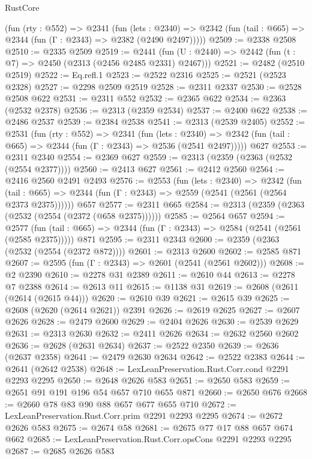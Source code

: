\begin{lexlean}{RustCore}
\begin{coremodule}
    (fun (rty : @552) =>
    @2341
      (fun (lets : @2340) =>
      @2342 (fun (tail : @665) => @2344 (fun (Γ : @2343) => @2382 (@2490 @2497)))))
@2509 := @2338 @2508
@2510 := @2335 @2509
@2519 := @2441 (fun (U : @2440) => @2442 (fun (t : @7) => @2450 (@2313 (@2456 @2485 @2331) @2467)))
@2521 := @2482 (@2510 @2519)
@2522 := Eq.refl.{1}
@2523 := @2522 @2316
@2525 := @2521 (@2523 @2328)
@2527 := @2298 @2509 @2519
@2528 := @2311 @2337
@2530 := @2528 @2508 @622
@2531 := @2311 @552
@2532 := @2365 @622
@2534 := @2363 (@2532 @2378)
@2536 := @2313 (@2359 @2534)
@2537 := @2400 @622
@2538 := @2486 @2537
@2539 := @2384 @2538
@2541 := @2313 (@2539 @2405)
@2552 := @2531
    (fun (rty : @552) =>
    @2341
      (fun (lets : @2340) =>
      @2342 (fun (tail : @665) => @2344 (fun (Γ : @2343) => @2536 (@2541 @2497)))))
    @627
@2553 := @2311 @2340
@2554 := @2369 @627
@2559 := @2313 (@2359 (@2363 (@2532 (@2554 @2377))))
@2560 := @2413 @627
@2561 := @2412 @2560
@2564 := @2416 @2560 @2491 @2493
@2576 := @2553
    (fun (lets : @2340) =>
    @2342
      (fun (tail : @665) => @2344 (fun (Γ : @2343) => @2559 (@2541 (@2561 (@2564 @2373 @2375))))))
    @657
@2577 := @2311 @665
@2584 := @2313 (@2359 (@2363 (@2532 (@2554 (@2372 (@658 @2375))))))
@2585 := @2564 @657
@2594 := @2577
    (fun (tail : @665) => @2344 (fun (Γ : @2343) => @2584 (@2541 (@2561 (@2585 @2375)))))
    @871
@2595 := @2311 @2343
@2600 := @2359 (@2363 (@2532 (@2554 (@2372 @872))))
@2601 := @2313 @2600
@2602 := @2585 @871
@2607 := @2595 (fun (Γ : @2343) => @2601 (@2541 (@2561 @2602)))
@2608 := @2 @2390
@2610 := @2278 @31 @2389
@2611 := @2610 @44
@2613 := @2278 @7 @2388
@2614 := @2613 @11
@2615 := @1138 @31
@2619 := @2608 (@2611 (@2614 (@2615 @44)))
@2620 := @2610 @39
@2621 := @2615 @39
@2625 := @2608 (@2620 (@2614 @2621)) @2391
@2626 := @2619 @2625
@2627 := @2607 @2626
@2628 := @2479 @2600
@2629 := @2404 @2626
@2630 := @2539 @2629
@2631 := @2313 @2630
@2632 := @2411 @2626
@2634 := @2632 @2560 @2602
@2636 := @2628 (@2631 @2634)
@2637 := @2522 @2350
@2639 := @2636 (@2637 @2358)
@2641 := @2479 @2630 @2634
@2642 := @2522 @2383
@2644 := @2641 (@2642 @2538)
@2648 := LexLeanPreservation.Rust.Corr.cond @2291 @2293 @2295
@2650 := @2648 @2626 @583
@2651 := @2650 @583
@2659 := @2651 @91 @191 @196 @54 @657 @710 @655 @871
@2660 := @2650 @676
@2668 := @2660 @78 @83 @90 @88 @657 @677 @655 @710
@2672 := LexLeanPreservation.Rust.Corr.prim @2291 @2293 @2295
@2674 := @2672 @2626 @583
@2675 := @2674 @58
@2681 := @2675 @77 @17 @88 @657 @674 @662
@2685 := LexLeanPreservation.Rust.Corr.opsCons @2291 @2293 @2295
@2687 := @2685 @2626 @583

\end{coremodule}
\end{lexlean}
